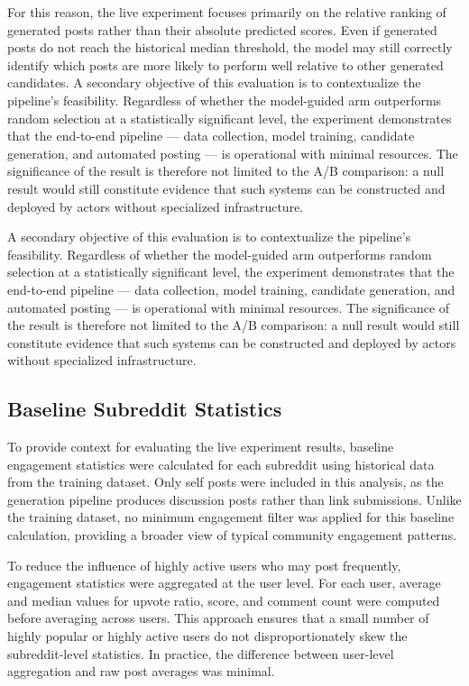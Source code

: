 For this reason, the live experiment focuses primarily on the relative ranking of generated posts rather than their absolute predicted scores. Even if generated posts do not reach the historical median threshold, the model may still correctly identify which posts are more likely to perform well relative to other generated candidates. A secondary objective of this evaluation is to contextualize the pipeline's feasibility. Regardless of whether the model-guided arm outperforms random selection at a statistically significant level, the experiment demonstrates that the end-to-end pipeline — data collection, model training, candidate generation, and automated posting — is operational with minimal resources. The significance of the result is therefore not limited to the A/B comparison: a null result would still constitute evidence that such systems can be constructed and deployed by actors without specialized infrastructure.

A secondary objective of this evaluation is to contextualize the pipeline's feasibility. Regardless of whether the model-guided arm outperforms random selection at a statistically significant level, the experiment demonstrates that the end-to-end pipeline — data collection, model training, candidate generation, and automated posting — is operational with minimal resources. The significance of the result is therefore not limited to the A/B comparison: a null result would still constitute evidence that such systems can be constructed and deployed by actors without specialized infrastructure.

\subsection{Baseline Subreddit Statistics}
\label{subsec:baseline_statistics}

To provide context for evaluating the live experiment results, baseline engagement statistics were calculated for each subreddit using historical data from the training dataset. Only self posts were included in this analysis, as the generation pipeline produces discussion posts rather than link submissions. Unlike the training dataset, no minimum engagement filter was applied for this baseline calculation, providing a broader view of typical community engagement patterns.

To reduce the influence of highly active users who may post frequently, engagement statistics were aggregated at the user level. For each user, average and median values for upvote ratio, score, and comment count were computed before averaging across users. This approach ensures that a small number of highly popular or highly active users do not disproportionately skew the subreddit-level statistics. In practice, the difference between user-level aggregation and raw post averages was minimal.

